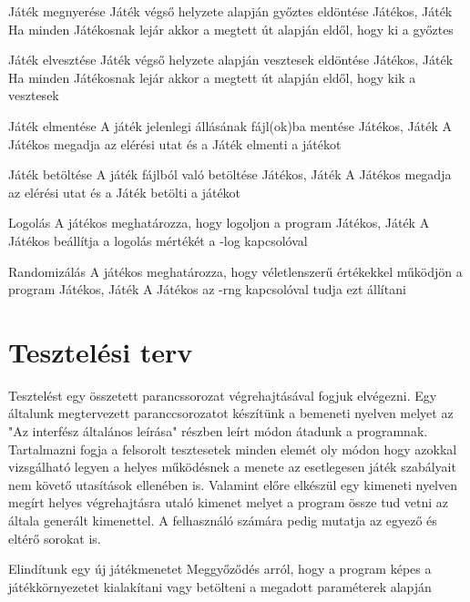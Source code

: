 \usecase%
{Játék megnyerése}%
{Játék végső helyzete alapján győztes eldöntése}%
{Játékos, Játék}%
{Ha minden Játékosnak lejár akkor a megtett út alapján eldől, hogy ki a győztes}

\usecase%
{Játék elvesztése}%
{Játék végső helyzete alapján vesztesek eldöntése}%
{Játékos, Játék}%
{Ha minden Játékosnak lejár akkor a megtett út alapján eldől, hogy kik a vesztesek}

\usecase%
{Játék elmentése}
{A játék jelenlegi állásának fájl(ok)ba mentése}
{Játékos, Játék}
{A Játékos megadja az elérési utat és a Játék elmenti a játékot}

\usecase%
{Játék betöltése}
{A játék fájlból való betöltése}
{Játékos, Játék}
{A Játékos megadja az elérési utat és a Játék betölti a játékot}

\usecase%
{Logolás}
{A játékos meghatározza, hogy logoljon a program}
{Játékos, Játék}
{A Játékos beállítja a logolás mértékét a -log kapcsolóval}

\usecase%
{Randomizálás}
{A játékos meghatározza, hogy véletlenszerű értékekkel működjön a program}
{Játékos, Játék}
{A Játékos az -rng kapcsolóval tudja ezt állítani}


\section{Tesztelési terv}

Tesztelést egy összetett parancssorozat végrehajtásával fogjuk elvégezni. Egy általunk megtervezett paranccsorozatot készítünk a bemeneti nyelven melyet az "Az interfész általános leírása" részben leírt módon átadunk a programnak. Tartalmazni fogja a felsorolt tesztesetek minden elemét oly módon hogy azokkal vizsgálható legyen a helyes működésnek a menete az esetlegesen játék szabályait nem követő utasítások ellenében is. Valamint előre elkészül egy kimeneti nyelven megírt helyes végrehajtásra utaló kimenet melyet a program össze tud vetni az általa generált kimenettel. A felhasználó számára pedig mutatja az egyező és eltérő sorokat is. 

%
{Elindítunk egy új játékmenetet}%
{Meggyőződés arról, hogy a program képes a játékkörnyezetet kialakítani vagy betölteni a megadott paraméterek alapján}

